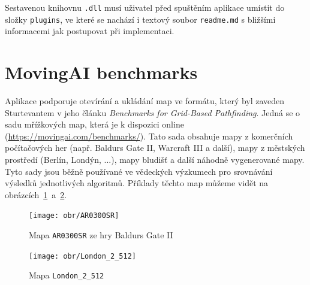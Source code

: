 Sestavenou knihovnu \texttt{.dll} musí uživatel před spuštěním aplikace umístit do složky \texttt{plugins}, ve které se nachází i textový soubor \texttt{readme.md} s bližšími informacemi jak postupovat při implementaci.




\section{MovingAI benchmarks}\label{sec:movingAI}
Aplikace podporuje otevírání a ukládání map ve formátu, který byl zaveden Sturtevantem \cite{Sturtevant2012} v jeho článku \emph{Benchmarks for Grid-Based Pathfinding}. Jedná se o sadu mřížkových map, která je k dispozici online (\url{https://movingai.com/benchmarks/}). Tato sada obsahuje mapy z komerčních počítačových her (např. Baldurs Gate II, Warcraft III a další), mapy z městských prostředí (Berlín, Londýn, ...), mapy bludišť a další náhodně vygenerované mapy. Tyto sady jsou běžně používané ve vědeckých výzkumech pro srovnávání výsledků jednotlivých algoritmů. Příklady těchto map můžeme vidět na obrázcích~\ref{obr:AR0300SR}~a~\ref{obr:London}.



\begin{figure}[htb]
	\begin{center}
		\texttt{[image: obr/AR0300SR]}
	\end{center}
	\caption[caption]{Mapa \texttt{AR0300SR} ze hry Baldurs Gate II \cite{Sturtevant2012}}
	\label{obr:AR0300SR}
\end{figure}

\begin{figure}[htb]
	\begin{center}
		\texttt{[image: obr/London\_2\_512]}
	\end{center}
	\caption[caption]{Mapa \texttt{London\_2\_512} \cite{Sturtevant2012}}
	\label{obr:London}
\end{figure}

